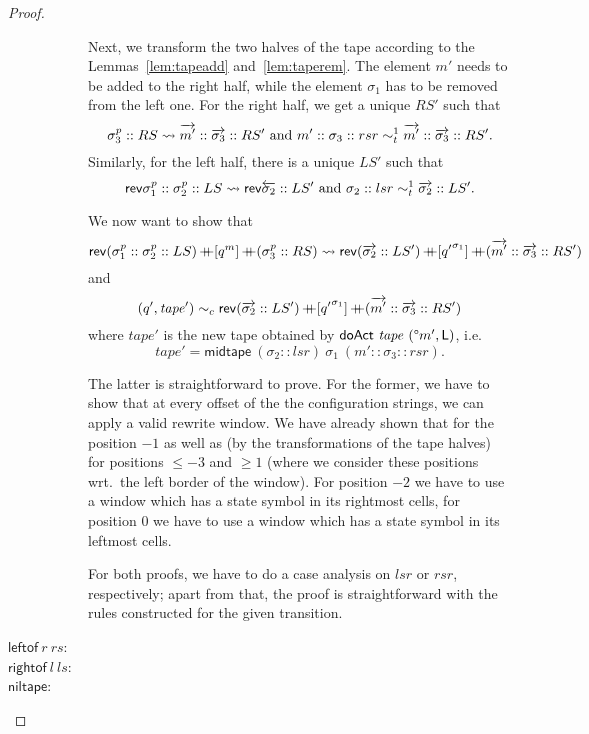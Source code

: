 \documentclass[a4paper,UKenglish,cleveref, autoref]{lipics-v2019}
\newcommand{\strent}{\rightsquigarrow}
\begin{document}
\begin{proof}
\begin{description}
\begin{description}
          Next, we transform the two halves of the tape according to the Lemmas~\ref{lem:tapeadd} and~\ref{lem:taperem}. The element $m'$ needs to be added to the right half, while the element $\sigma_1$ has to be removed from the left one. 
          For the right half, we get a unique $RS'$ such that 
          \[\sigma_3^p :: RS \strent{} \polpos{m'} :: \polpos{\sigma_3} :: RS' \text{ and } m' :: \sigma_3 :: rsr \reprt{1} \polpos{m'} :: \polpos{\sigma_3} :: RS'.\]
          Similarly, for the left half, there is a unique $LS'$ such that 
          \[\rev{\sigma_1^p :: \sigma_2^p :: LS} \strent{} \rev{\polneg{\sigma_2} :: LS'} \text{ and } \sigma_2 :: lsr \reprt{1} \polpos{\sigma_2} :: LS'.\]

          We now want to show that 
          \[\rev{(\sigma_1^p :: \sigma_2^p :: LS)} \concat [q^m] \concat (\sigma_3^p :: RS) \strent{} \rev{(\polpos{\sigma_2} :: LS')} \concat [{q'}^{\sigma_1}] \concat (\polpos{m'} :: \polpos{\sigma_3} :: RS') \]
          and 
          \[ 
            (q', \mathit{tape}') \sim_c{} \mathsf{rev}{(\overrightarrow{\sigma_2} :: LS')} \mathop{{+}\!\!\!{+}} [{q'}^{\sigma_1}] \mathop{{+}\!\!\!{+}} (\overrightarrow{m'} :: \overrightarrow{\sigma_3} :: RS') 
          \]
          where $\mathit{tape}'$ is the new tape obtained by $\textsf{doAct}~\mathit{tape}~(\degree m', \textsf{L})$, i.e.\ 
          \[\mathit{tape}' = \textsf{midtape}~(\sigma_2 :: lsr)~\sigma_1~(m' :: \sigma_3 :: rsr).\]

          The latter is straightforward to prove. For the former, we have to show that at every offset of the the configuration strings, we can apply a valid rewrite window. We have already shown that for the position $-1$ as well as (by the transformations of the tape halves) for positions $\le -3$ and $\ge 1$ (where we consider these positions wrt.\ the left border of the window).
          For position $-2$ we have to use a window which has a state symbol in its rightmost cells, for position $0$ we have to use a window which has a state symbol in its leftmost cells.

          For both proofs, we have to do a case analysis on $lsr$ or $rsr$, respectively; apart from that, the proof is straightforward with the rules constructed for the given transition.
      \end{description}
    \item[$\textsf{leftof}~r~rs$:]
    \item[$\textsf{rightof}~l~ls$:]
    \item[$\textsf{niltape}$:]
  \end{description}
\end{proof}
\end{document}
